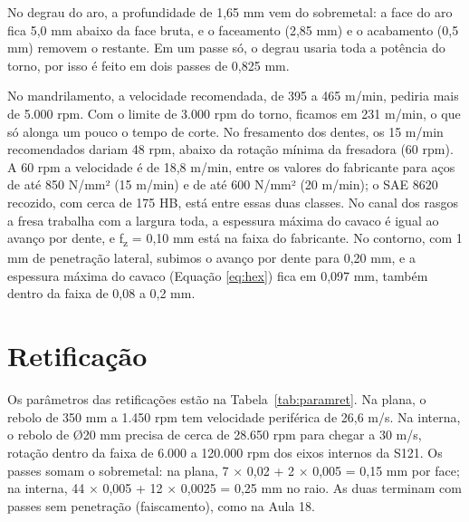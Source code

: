 No degrau do aro, a profundidade de 1,65 mm vem do sobremetal: a face do aro fica 5,0 mm abaixo da face bruta, e o faceamento (2,85 mm) e o acabamento (0,5 mm) removem o restante. Em um passe só, o degrau usaria toda a potência do torno, por isso é feito em dois passes de 0,825 mm.

No mandrilamento, a velocidade recomendada, de 395 a 465 m/min, pediria mais de 5.000 rpm. Com o limite de 3.000 rpm do torno, ficamos em 231 m/min, o que só alonga um pouco o tempo de corte. No fresamento dos dentes, os 15 m/min recomendados dariam 48 rpm, abaixo da rotação mínima da fresadora (60 rpm). A 60 rpm a velocidade é de 18,8 m/min, entre os valores do fabricante para aços de até 850 N/mm² (15 m/min) e de até 600 N/mm² (20 m/min); o SAE 8620 recozido, com cerca de 175 HB, está entre essas duas classes. No canal dos rasgos a fresa trabalha com a largura toda, a espessura máxima do cavaco é igual ao avanço por dente, e f\textsubscript{z} = 0,10 mm está na faixa do fabricante. No contorno, com 1 mm de penetração lateral, subimos o avanço por dente para 0,20 mm, e a espessura máxima do cavaco (Equação \eqref{eq:hex}) fica em 0,097 mm, também dentro da faixa de 0,08 a 0,2 mm.

\section{Retificação}

Os parâmetros das retificações estão na Tabela~\ref{tab:paramret}. Na plana, o rebolo de 350 mm a 1.450 rpm tem velocidade periférica de 26,6 m/s. Na interna, o rebolo de Ø20 mm precisa de cerca de 28.650 rpm para chegar a 30 m/s, rotação dentro da faixa de 6.000 a 120.000 rpm dos eixos internos da S121. Os passes somam o sobremetal: na plana, 7 $\times$ 0,02 + 2 $\times$ 0,005 = 0,15 mm por face; na interna, 44 $\times$ 0,005 + 12 $\times$ 0,0025 = 0,25 mm no raio. As duas terminam com passes sem penetração (faiscamento), como na Aula 18.

